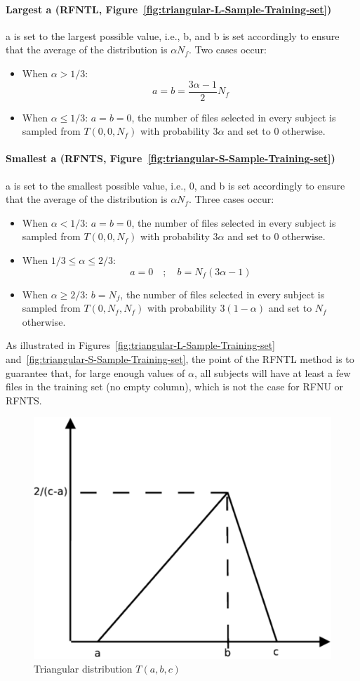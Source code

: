 \documentclass[10pt, conference, compsocconf]{IEEEtran}
\begin{document}
\paragraph{Largest a (RFNTL, 
Figure~\ref{fig:triangular-L-Sample-Training-set})} a is set to the 
largest possible value, i.e., b, and b is set accordingly to ensure 
that the average of the distribution is $\alpha N_{f}$. Two cases occur:
\begin{itemize}
\item When $\alpha > 1/3$:
\[ \textit{a}=\textit{b}=\frac{3\alpha-1}{2}N_{f}
\]
\item When $\alpha \leq 1/3$: $a=b=0$, the number of files selected 
in every subject is sampled from $T(0, 0, N_f)$ with probability 
$3\alpha$ and set to 0 otherwise.
\end{itemize}

\paragraph{Smallest a (RFNTS, 
Figure~\ref{fig:triangular-S-Sample-Training-set})} a is set to the 
smallest possible value, i.e., 0, and b is set accordingly to ensure that the average of the
distribution is $\alpha N_{f}$. Three cases occur:
\begin{itemize}
\item When $\alpha < 1/3$: $a=b=0$, the number of files 
selected in every subject is sampled from $T(0, 0, N_f)$ with 
probability $3\alpha$ and set to 0 otherwise.
\item When $1/3 \leq \alpha \leq 2/3$:
\[
          \textit{a} = 0   \quad ; \quad
          \textit{b}=N_{f}(3\alpha-1)
\]
\item When $\alpha \geq 2/3$: $b=N_f$, the number of files selected in 
every subject is sampled from $T(0, N_f, N_f)$ with probability 
$3(1-\alpha)$ 
and set to $N_f$ otherwise.
\end{itemize}

As illustrated in Figures~\ref{fig:triangular-L-Sample-Training-set} 
and~\ref{fig:triangular-S-Sample-Training-set}, the point of the 
RFNTL method is to guarantee that, for large enough values of 
$\alpha$, all subjects will have at least a few files in the training 
set (no empty column), which is not the case for RFNU or RFNTS.
\begin{figure}
\centering
\includegraphics[width=0.5\columnwidth]{figures/triangular.pdf}
\caption{Triangular distribution $T(a, b, c)$}
\label{fig:triangular}
\end{figure}
\end{document}
